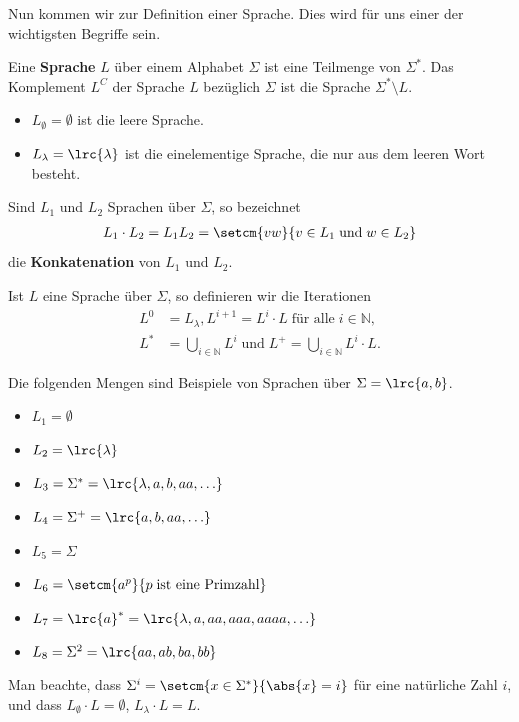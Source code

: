 Nun kommen wir zur Definition einer Sprache. Dies wird für uns einer der wichtigsten Begriffe sein.
\begin{mydefinition}[Sprache]\label{mydefinition:Sprache}
Eine \textbf{Sprache} $L$ über einem Alphabet $\Sigma$ ist eine Teilmenge von $\Sigma^*$. Das Komplement $L^C$ der Sprache $L$ bezüglich $\Sigma$ ist die Sprache $\Sigma^*\setminus L$.
\begin{itemize}
	\item $L_{\emptyset} = \emptyset$ ist die leere Sprache.
	\item $L_{\lambda} = \lrc{\lambda}$ ist die einelementige Sprache, die nur aus dem leeren Wort besteht.
\end{itemize}
Sind $L_1$ und $L_2$ Sprachen über $\Sigma$, so bezeichnet
\begin{align*}
	L_1\cdot L_2 = L_1L_2 = \setcm{vw}{v\in L_1\; \text{und}\; w\in L_2}
\end{align*}
die \textbf{Konkatenation} von $L_1$ und $L_2$.

Ist $L$ eine Sprache über $\Sigma$, so definieren wir die Iterationen
\begin{align*}
	L^0 & = L_{\lambda}, L^{i+1} = L^i\cdot L\;\text{für alle}\; i\in\mathbb{N},                \\
	L^* & = \bigcup_{i\in\mathbb{N}}L^i\;\text{und}\; L^+ = \bigcup_{i\in\mathbb{N}}L^i\cdot L.
\end{align*}
\end{mydefinition}

\begin{myexample}
Die folgenden Mengen sind Beispiele von Sprachen über $\Sigma = \lrc{a,b}$.
\begin{itemize}
	\item $L_1 = \emptyset$
	\item $L_2 = \lrc{\lambda}$
	\item $L_3 = \Sigma^* = \lrc{\lambda, a,b,aa,\ldots }$
	\item $L_4 = \Sigma^+ = \lrc{a,b,aa,\ldots }$
	\item $L_5 = \Sigma$
	\item $L_6 = \setcm{a^p}{p\;\text{ist eine Primzahl}}$
	\item $L_7 = \lrc{a}^* = \lrc{\lambda, a, aa, aaa, aaaa, \ldots }$
	\item $L_8 = \Sigma^2 = \lrc{aa,ab,ba,bb}$
\end{itemize}
\end{myexample}
Man beachte, dass $\Sigma^i = \setcm{x\in\Sigma^*}{\abs{x} = i}$ für eine natürliche Zahl $i$, und dass $L_{\emptyset}\cdot L = \emptyset$, $L_{\lambda}\cdot L = L$.

